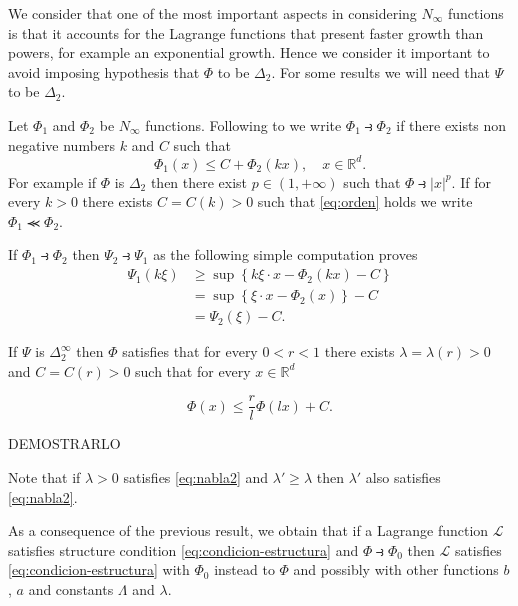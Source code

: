 \documentclass[twoside]{article}
\theoremstyle{remark}
\newcommand{\rr}{\mathbb{R}}
\renewcommand{\leq}{\leqslant}
\renewcommand{\geq}{\geqslant}
\newcounter{example}[section]
\begin{document}
We consider that one of the most important aspects in considering $N_{\infty}$ functions is that it accounts for the Lagrange functions that present faster growth than powers, for example an exponential growth. Hence we consider it important to avoid imposing hypothesis that $\Phi$ to be $\Delta_2$. For some results we will need that $\Psi$ to be $\Delta_2$. 


Let $\Phi_1$ and $\Phi_2$ be   $N_{\infty}$ functions. Following to \cite{trudinger1974imbedding} we write $\Phi_1\strictif\Phi_2$ if there exists non negative numbers $k$ and $C$ such that
\begin{equation}\label{eq:orden} \Phi_1(x)\leq C+\Phi_2(kx),\quad x\in\rr^d.\end{equation}
For example if $\Phi$ is $\Delta_2$ then there exist $p\in (1,+\infty)$ such that $\Phi\strictif |x|^p$.  If for every $k>0$ there exists $C=C(k)>0$ such that \eqref{eq:orden} holds we write  $\Phi_1\llcurly\Phi_2$. 

If $\Phi_1\strictif \Phi_2$ then $\Psi_2\strictif\Psi_1$ as the following simple computation proves 
\[
\begin{split}
  \Psi_1(k\xi)&\geq \sup \left\{k\xi\cdot x-\Phi_2(kx)-C\right\}\\
&=\sup \left\{\xi\cdot x-\Phi_2(x)\right\}-C\\
&=\Psi_2\left(\xi\right)-C.
\end{split}
\]


If $\Psi$ is $\Delta_2^{\infty}$ then $\Phi$ satisfies that for every $0<r<1$ there exists $\lambda=\lambda(r)>0$ and $C=C(r)>0$ such that for every $x\in\rr^d$

\begin{equation}\label{eq:nabla2}
  \Phi(x)\leq \frac{r}{l}\Phi(l x)+C.
\end{equation}

DEMOSTRARLO

Note that if $\lambda>0$ satisfies \eqref{eq:nabla2} and $\lambda'\geq\lambda$ then $\lambda'$ also satisfies \eqref{eq:nabla2}.


As a consequence of the previous result, we obtain that if a Lagrange function $\mathcal{L}$ satisfies structure condition \eqref{eq:condicion-estructura} and $\Phi\strictif \Phi_0$ then $\mathcal{L}$ satisfies \eqref{eq:condicion-estructura} with $\Phi_0$ instead to $\Phi$ and possibly with other functions $b$, $a$ and constants $\Lambda$ and $\lambda$.
\end{document}
